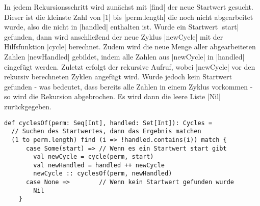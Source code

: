 In jedem Rekursionsschritt wird zunächst mit |find| der neue Startwert gesucht.
Dieser ist die kleinste Zahl von |1| bis |perm.length| die noch nicht abgearbeitet wurde, also die nicht in |handled| enthalten ist.
Wurde ein Startwert |start| gefunden, dann wird anschließend der neue Zyklus |newCycle| mit der Hilfsfunktion |cycle| berechnet.
Zudem wird die neue Menge aller abgearbeiteten Zahlen |newHandled| gebildet, indem alle Zahlen aus |newCycle| in |handled| eingefügt werden.
Zuletzt erfolgt der rekursive Aufruf, wobei |newCycle| vor den rekursiv berechneten Zyklen angefügt wird.
Wurde jedoch kein Startwert gefunden - was bedeutet, dass bereits alle Zahlen in einem Zyklus vorkommen - so wird die Rekursion abgebrochen.
Es wird dann die leere Liste |Nil| zurückgegeben.
\lstset{language=Scala}
\lstset{basicstyle=\ttfamily}
\begin{lstlisting}
def cyclesOf(perm: Seq[Int], handled: Set[Int]): Cycles =
  // Suchen des Startwertes, dann das Ergebnis matchen
  (1 to perm.length) find (i => !handled.contains(i)) match {
      case Some(start) => // Wenn es ein Startwert start gibt
        val newCycle = cycle(perm, start)
        val newHandled = handled ++ newCycle
        newCycle :: cyclesOf(perm, newHandled)
      case None =>        // Wenn kein Startwert gefunden wurde
        Nil
    }
\end{lstlisting}
